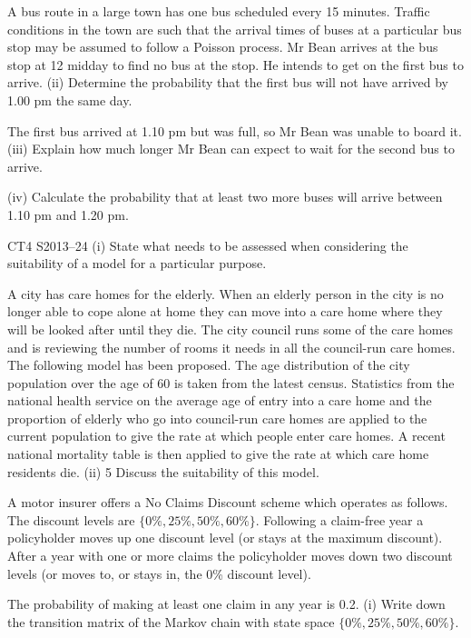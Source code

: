 \documentclass[a4paper,12pt]{article}
\begin{document}
\begin{enumerate}

A bus route in a large town has one bus scheduled every 15 minutes. Traffic
conditions in the town are such that the arrival times of buses at a particular bus stop
may be assumed to follow a Poisson process.
Mr Bean arrives at the bus stop at 12 midday to find no bus at the stop. He intends to
get on the first bus to arrive.
(ii)
Determine the probability that the first bus will not have arrived by 1.00 pm
the same day.

The first bus arrived at 1.10 pm but was full, so Mr Bean was unable to board it.
(iii) Explain how much longer Mr Bean can expect to wait for the second bus to
arrive.

(iv) Calculate the probability that at least two more buses will arrive between
1.10 pm and 1.20 pm.

CT4 S2013–24
(i)
State what needs to be assessed when considering the suitability of a model for
a particular purpose.

A city has care homes for the elderly. When an elderly person in the city is no longer
able to cope alone at home they can move into a care home where they will be looked
after until they die.
The city council runs some of the care homes and is reviewing the number of rooms it needs in all the council-run care homes. The following model has been proposed.
The age distribution of the city population over the age of 60 is taken from the latest census. Statistics from the national health service on the average age of entry into a
care home and the proportion of elderly who go into council-run care homes are applied to the current population to give the rate at which people enter care homes. A
recent national mortality table is then applied to give the rate at which care home residents die.
(ii)
5
Discuss the suitability of this model.

A motor insurer offers a No Claims Discount scheme which operates as follows. The discount levels are $\{0\%,25\%, 50\%, 60\%\}$. Following a claim-free year a
policyholder moves up one discount level (or stays at the maximum discount). After a year with one or more claims the policyholder moves down two discount levels (or
moves to, or stays in, the 0\% discount level).

The probability of making at least one claim in any year is 0.2.
(i) Write down the transition matrix of the Markov chain with state space $\{0\%,25\%, 50\%, 60\%\}$.


\end{enumerate}
\end{document}
